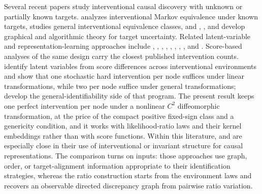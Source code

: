 Several recent papers study interventional causal discovery with unknown or partially known targets. \citet{Hauser2012} analyzes interventional Markov equivalence under known targets, \citet{Yang2018} studies general interventional equivalence classes, and \citet{JaberEtAl2020SoftUnknownTargets}, \citet{Dai2025}, and \citet{Zhang2026} develop graphical and algorithmic theory for target uncertainty. Related latent-variable and representation-learning approaches include \citet{Kivva2021}, \citet{Xie2024}, \citet{JiangAragam2023UnknownInterventions}, \citet{BuchholzEtAl2023LinearCausalRepresentations}, \citet{AhujaEtAl2023InterventionalCRL}, \citet{Varici2024}, \citet{VariciEtAl2025ScoreBasedCRL}, \citet{Bing2024}, and \citet{NgEtAl2025GeneralEnvironments}. Score-based analyses of the same design carry the closest published intervention counts. \citet{VariciEtAl2025ScoreBasedCRL} identify latent variables from score differences across interventional environments and show that one stochastic hard intervention per node suffices under linear transformations, while two per node suffice under general transformations; \citet{Varici2024} develop the general-identifiability side of that program. The present result keeps one perfect intervention per node under a nonlinear \(C^2\) diffeomorphic transformation, at the price of the compact positive fixed-sign class and a genericity condition, and it works with likelihood-ratio laws and their kernel embeddings rather than with score functions. Within this literature, \citet{WendongEtAl2023CauCA} and \citet{YaoEtAl2025InvariancePrinciple} are especially close in their use of interventional or invariant structure for causal representations. The comparison turns on inputs: those approaches use graph, order, or target-alignment information appropriate to their identification strategies, whereas the ratio construction starts from the environment laws and recovers an observable directed discrepancy graph from pairwise ratio variation.

